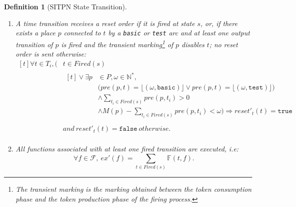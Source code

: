 \documentclass[pdflatex,sn-mathphys]{sn-jnl}%
\theoremstyle{thmstyleone}%
\theoremstyle{thmstyletwo}%
\theoremstyle{thmstylethree}%
\newtheorem{definition}{Definition}%
\begin{document}
\begin{definition}[SITPN State Transition]
\begin{itemize}
\begin{enumerate}
    \item\label{it:reset-order} A time transition receives a reset
      order if it is fired at state $s$, or, if there exists a place
      $p$ connected to $t$ by a \texttt{basic} or \texttt{test} arc
      and at least one output transition of $p$ is fired and the
      transient marking\footnote{The transient marking is the marking
        obtained between the token consumption phase and the token
        production phase of the firing process.} of $p$ disables $t$;
      no reset order is sent otherwise:
      \begin{equation*}
        \begin{aligned}[t]
          \forall{}t\in{}T_i,\Big(&t\in{}Fired(s) \\
                                  & \begin{aligned}[t]
                                      \lor\exists{}p&\in{}P,\omega\in\mathbb{N}^{*}, \\
                                                    & \big(pre(p,t)=\lfloor(\omega,\mathtt{basic})\rfloor\lor{}pre(p,t)=\lfloor(\omega,\mathtt{test})\rfloor\big) \\
                                                    &\land\sum\limits_{t_i\in{}Fired(s)}pre(p,t_i)>0 \\
                                                    &\land{}M(p)-\sum\limits_{t_i\in{}Fired(s)}pre(p,t_i)<\omega\Big)\Rightarrow{}reset'_t(t)=\mathtt{true}\\
                                    \end{aligned} \\
                                  & and~reset'_t(t)=\mathtt{false}~otherwise. \\
        \end{aligned}
      \end{equation*}
      
    \item\label{it:exec-fun} All functions associated with at least one fired transition are executed, i.e:
      \begin{equation*}
        \forall{}f\in{}\mathcal{F},~ex'(f)=\sum\limits_{t\in{}Fired(s)}\mathbb{F}(t,f).
      \end{equation*}
    \end{enumerate}
    

\end{itemize}
\end{definition}
\end{document}
